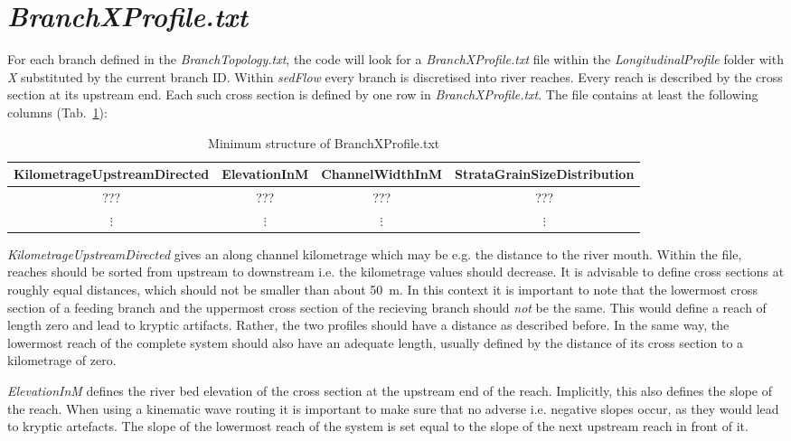 \documentclass[11pt,a4paper]{article}
\newcommand{\tablefontsize}[0]{\small}
\begin{document}
\section{\mbox{\emph{BranchXProfile.txt}}}\label{BranchXProfile}
For each branch defined in the \emph{BranchTopology.txt}, the code will look for a \mbox{\emph{BranchXProfile.txt}} file within the \emph{LongitudinalProfile} folder with \emph{X} substituted by the current branch ID. Within \emph{sedFlow} every branch is discretised into river reaches. Every reach is described by the cross section at its upstream end. Each such cross section is defined by one row in \mbox{\emph{BranchXProfile.txt}}. The file contains at least the following columns (Tab.~\ref{MinimumBranchXProfile}):

\begin{table}[h]
\caption{Minimum structure of BranchXProfile.txt}
\label{MinimumBranchXProfile}
\vskip4mm
\tablefontsize
\begin{adjustwidth}{-4cm}{-4cm}
\centering
\begin{tabular}{c|c|c|c}
\hline\hline
KilometrageUpstreamDirected & ElevationInM & ChannelWidthInM & StrataGrainSizeDistribution\\
\hline
??? & ??? & ??? & ???\\
\hline
$\vdots$ & $\vdots$ & $\vdots$ & $\vdots$\\
\hline\hline
\end{tabular}
\end{adjustwidth}
\end{table}

\emph{KilometrageUpstreamDirected} gives an along channel kilometrage which may be e.g. the distance to the river mouth. Within the file, reaches should be sorted from upstream to downstream i.e. the kilometrage values should decrease. It is advisable to define cross sections at roughly equal distances, which should not be smaller than about 50~m. In this context it is important to note that the lowermost cross section of a feeding branch and the uppermost cross section of the recieving branch should \emph{not} be the same. This would define a reach of length zero and lead to kryptic artifacts. Rather, the two profiles should have a distance as described before. In the same way, the lowermost reach of the complete system should also have an adequate length, usually defined by the distance of its cross section to a kilometrage of zero.

\emph{ElevationInM} defines the river bed elevation of the cross section at the upstream end of the reach. Implicitly, this also defines the slope of the reach. When using a kinematic wave routing it is important to make sure that no adverse i.e. negative slopes occur, as they would lead to kryptic artefacts. The slope of the lowermost reach of the system is set equal to the slope of the next upstream reach in front of it.
\end{document}

